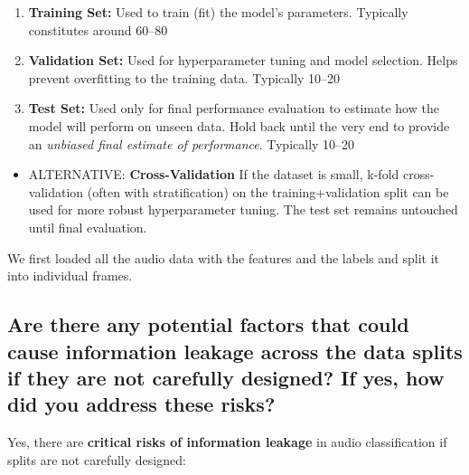 \begin{enumerate}
	\item {\bf Training Set: } Used to train (fit) the model's parameters. Typically constitutes around 60–80%
	
	\item {\bf Validation Set: } Used for hyperparameter tuning and model selection. Helps prevent overfitting to the training data. Typically 10–20%

	\item {\bf Test Set: } Used only for final performance evaluation to estimate how the model will perform on unseen data. Hold back until the very end to provide an {\it unbiased final estimate of performance}. Typically 10–20%
\end{enumerate}

\begin{itemize}
	\item \uppercase{Alternative: } {\bf Cross-Validation} If the dataset is small, k-fold cross-validation (often with stratification) on the training+validation split can be used for more robust hyperparameter tuning. The test set remains untouched until final evaluation.
\end{itemize}


We first loaded all the audio data with the features and the labels and split it into individual frames. 




\subsection{Are there any potential factors that could cause information leakage across the data splits if they are not carefully designed? If yes, how did you address these risks?}
Yes, there are {\bf critical risks of information leakage} in audio classification if splits are not carefully designed:


\label{sec:Data Split:b}


